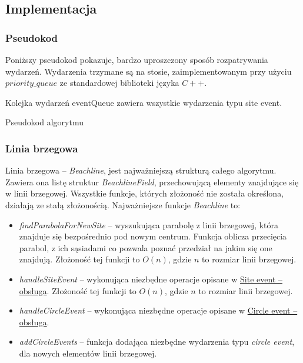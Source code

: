 \documentclass[declaration,shortabstract, inz]{iithesis}
\theoremstyle{definition} \newtheorem{definition}{Definicja}[]
\theoremstyle{plain} \newtheorem{remark}[definition]{Obserwacja}
\theoremstyle{plain} \newtheorem{theorem}[definition]{Twierdzenie}
\theoremstyle{plain} \newtheorem{example}{Przykład}[definition]
\theoremstyle{plain} \newtheorem{lemma}[definition]{Lemat}
\begin{document}
\newpage

\subsection{Implementacja}

\subsubsection{Pseudokod}
Poniższy pseudokod pokazuje, bardzo uproszczony sposób rozpatrywania wydarzeń. Wydarzenia trzymane są na stosie, zaimplementowanym przy użyciu $priority\_queue$ ze standardowej biblioteki języka $C++$.

\begin{algorithm}[H]
\SetAlgoLined
	Kolejka wydarzeń eventQueue zawiera wszystkie wydarzenia typu site event.\\
 \caption{Pseudokod algorytmu}
\end{algorithm}

\subsubsection{Linia brzegowa}
Linia brzegowa -- \textit{Beachline}, jest najważniejszą strukturą całego algorytmu. Zawiera ona listę struktur \textit{BeachlineField}, przechowującą elementy znajdujące się w linii brzegowej. Wszystkie funkcje, których złożoność nie została określona, działają ze stałą złożonością. Najważniejsze funkcje \textit{Beachline} to:

\begin{itemize}
\item \textit{findParabolaForNewSite} -- wyszukująca parabolę z linii brzegowej, która znajduje się bezpośrednio pod nowym centrum. Funkcja oblicza przecięcia parabol, z ich sąsiadami co pozwala poznać przedział na jakim się one znajdują. Złożoność tej funkcji to $O(n)$, gdzie $n$ to rozmiar linii brzegowej.

\item \textit{handleSiteEvent} -- wykonująca niezbędne operacje opisane w \hyperref[sec:site]{Site event -- obsługa}. Złożoność tej funkcji to $O(n)$, gdzie $n$ to rozmiar linii brzegowej.

\item \textit{handleCircleEvent} -- wykonująca niezbędne operacje opisane w \hyperref[sec:circle]{Circle event -- obsługa}.

\item \textit{addCircleEvents} -- funkcja dodająca niezbędne wydarzenia typu \textit{circle event}, dla nowych elementów linii brzegowej.
\end{itemize}
\end{document}
